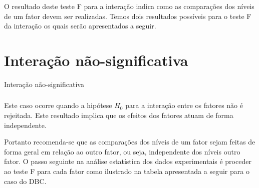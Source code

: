 \documentclass[14pt,aspectratio=1610]{beamer}
\begin{document}
\begin{frame}{}
\frametitle{}
\begin{block}{}
\justifying
O resultado deste teste F para a interação indica como as comparações dos
níveis de um fator devem ser realizadas. Temos dois resultados possíveis para
o teste F da interação os quais serão apresentados a seguir.

\end{block}
\end{frame}

\section{Interação não-significativa}
\begin{frame}{Interação não-significativa}
\frametitle{}
\begin{block}{}
\justifying
Este caso ocorre quando a hipótese $H_{0}$ para a interação entre os fatores
não é rejeitada. Este resultado implica que os efeitos dos fatores atuam de
forma independente.
\end{block}
\pause
\begin{block}{}
\justifying
Portanto recomenda-se que as comparações dos níveis de um fator
sejam feitas de forma geral em relação ao outro fator, ou seja, independente
dos níveis outro fator. O passo seguinte na análise estatística dos dados
experimentais é proceder ao teste F para cada fator como ilustrado na tabela
apresentada a seguir para o caso do DBC.
\end{block}
\end{frame}

\begin{frame}{}
\frametitle{}
\begin{block}{}
\begin{table}[!h]
\end{table}
\end{block}
\end{frame}
\end{document}
